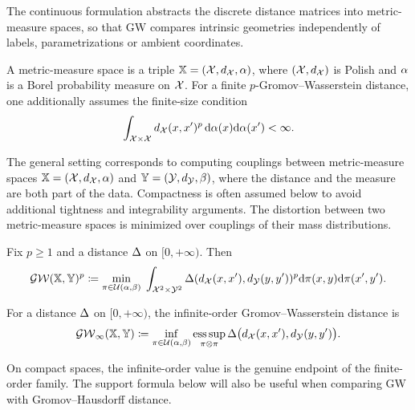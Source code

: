 The continuous formulation abstracts the discrete distance matrices into metric-measure spaces, so that GW compares intrinsic geometries independently of labels, parametrizations or ambient coordinates.
\begin{defn}\label{def-metric-measure-space}
	A metric-measure space is a triple
	$\mathbb{X}=(\mathcal{X},d_{\mathcal{X}},\alpha)$,
	where $(\mathcal{X},d_{\mathcal{X}})$ is Polish and $\alpha$ is a Borel probability measure on $\mathcal{X}$. For a finite $p$-Gromov--Wasserstein distance, one additionally assumes the finite-size condition
	\[
		\int_{\mathcal{X}\times\mathcal{X}}d_{\mathcal{X}}(x,x')^p\,\mathrm{d}\alpha(x)\mathrm{d}\alpha(x')<\infty.
	\]
\end{defn}
The general setting corresponds to computing couplings between metric-measure spaces $\mathbb{X}=(\mathcal{X},d_{\mathcal{X}},\alpha)$ and $\mathbb{Y}=(\mathcal{Y},d_{\mathcal{Y}},\beta)$, where the distance and the measure are both part of the data. Compactness is often assumed below to avoid additional tightness and integrability arguments.
%
The distortion between two metric-measure spaces is minimized over couplings of their mass distributions.
\begin{defn}\label{def-gromov-wasserstein}
		Fix $p\geq1$ and a distance $\Delta$ on $[0,+\infty)$. Then
		\begin{align}
		\label{eq-gw-generic}
		\operatorname{\mathcal{GW}}( \mathbb{X},\mathbb{Y} )^p \coloneqq
		\underset{ \pi \in \mathcal{U}(\alpha,\beta) }{\min}\;
		\int_{\mathcal{X}^2 \times \mathcal{Y}^2}
		 \Delta(d_{\mathcal{X}}(x,x'),d_{\mathcal{Y}}(y,y'))^p
			 \mathrm{d}\pi(x,y)\mathrm{d}\pi(x',y').
		\end{align}
\end{defn}
\begin{defn}\label{def-gromov-wasserstein-infinity}
	For a distance $\Delta$ on $[0,+\infty)$, the infinite-order Gromov--Wasserstein distance is
	\begin{equation}\label{eq-gw-infinity}
		\operatorname{\mathcal{GW}}_\infty(\mathbb{X},\mathbb{Y})
		\coloneqq
		\inf_{\pi\in\mathcal{U}(\alpha,\beta)}
		\operatorname*{ess\,sup}_{\pi\otimes\pi}
		\Delta\bigl(d_{\mathcal{X}}(x,x'),d_{\mathcal{Y}}(y,y')\bigr).
	\end{equation}
\end{defn}
On compact spaces, the infinite-order value is the genuine endpoint of the finite-order family. The support formula below will also be useful when comparing GW with Gromov--Hausdorff distance.

